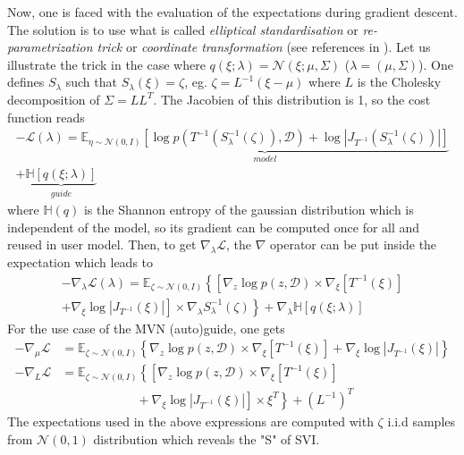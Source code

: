 \documentclass[final,5p,times,twocolumn,authoryear]{elsarticle}
\newcommand{\nn}{\nonumber}
\begin{document}
Now, one is faced with the evaluation of the expectations during gradient descent. The solution is to use what is called \textit{elliptical standardisation} or \textit{re-parametrization trick} or \textit{coordinate transformation} (see references in \citep{2015arXiv150603431K}). Let us illustrate the trick in the case where $q(\xi; \lambda) = \mathcal{N}(\xi; \mu, \Sigma)$ ($\lambda=(\mu, \Sigma)$). One defines $S_\lambda$ such that $S_\lambda(\xi)=\zeta$, eg. $\zeta = L^{-1}(\xi-\mu)$ where $L$ is the Cholesky decomposition of $\Sigma=LL^T$. The Jacobien of this distribution is 1, so the cost function reads
\begin{multline}
-\mathcal{L}(\lambda) = \underbrace{\mathbb{E}_{\eta\sim \mathcal{N}(0,I)}\left[ \log p(T^{-1}(S_\lambda^{-1}(\zeta)),\mathcal{D}) + \log |J_{T^{-1}}(S_\lambda^{-1}(\zeta))| \right]}_{model} \\ + \underbrace{\mathbb{H}[q(\xi;\lambda)]}_{guide}
\label{eq-loss-svi-3}
\end{multline}
where $\mathbb{H}(q)$ is the Shannon entropy of the gaussian distribution which is independent of the model, so its gradient can be computed once for all and reused in user model. Then,
to get $\nabla_\lambda \mathcal{L}$, the $\nabla$ operator can be put inside the expectation which leads to
\begin{multline}
-\nabla_\lambda\mathcal{L}(\lambda) = \mathbb{E}_{\zeta\sim \mathcal{N}(0,I)}\left\{
\left[ \nabla_z \log p(z,\mathcal{D}) \times \nabla_\xi[T^{-1}(\xi)] \right. \right. \\
+ \left. \left. \nabla_\xi \log|J_{T^{-1}}(\xi)| \right] \times \nabla_\lambda S_\lambda^{-1}(\zeta)
\right\}
+ \nabla_\lambda \mathbb{H}[q(\xi;\lambda)]
\label{eq-loss-svi-4}
\end{multline}
For the use case of the MVN (auto)guide, one gets
\begin{align}
-\nabla_\mu \mathcal{L} &= \mathbb{E}_{\zeta\sim \mathcal{N}(0,I)}\left\{
\nabla_z \log p(z,\mathcal{D}) \times \nabla_\xi[T^{-1}(\xi)]
+ \nabla_\xi \log|J_{T^{-1}}(\xi)|
\right\} \nn \\
-\nabla_L \mathcal{L} &= \mathbb{E}_{\zeta\sim \mathcal{N}(0,I)}\left\{
\left[ \nabla_z \log p(z,\mathcal{D}) \times \nabla_\xi[T^{-1}(\xi)] \right.\right. \nn\\
&\left. \left. \qquad\qquad\qquad + \nabla_\xi \log|J_{T^{-1}}(\xi)| \right] \times \xi^T 
\right\}+ (L^{-1})^T
\end{align}
The expectations used in the above expressions are computed with $\zeta$ i.i.d samples from $\mathcal{N}(0,1)$ distribution which reveals the "S" of SVI.
\end{document}
